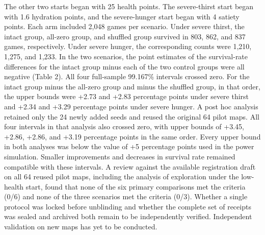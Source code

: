 \documentclass{article}
\begin{document}
The other two starts began with 25 health points. The severe-thirst start began with 1.6 hydration points, and the severe-hunger start began with 4 satiety points. Each arm included 2,048 games per scenario. Under severe thirst, the intact group, all-zero group, and shuffled group survived in 803, 862, and 837 games, respectively. Under severe hunger, the corresponding counts were 1,210, 1,275, and 1,233. In the two scenarios, the point estimates of the survival-rate differences for the intact group minus each of the two control groups were all negative (Table 2). All four full-sample 99.167\% intervals crossed zero. For the intact group minus the all-zero group and minus the shuffled group, in that order, the upper bounds were +2.73 and +2.83 percentage points under severe thirst and +2.34 and +3.29 percentage points under severe hunger. A post hoc analysis retained only the 24 newly added seeds and reused the original 64 pilot maps. All four intervals in that analysis also crossed zero, with upper bounds of +3.45, +2.86, +2.86, and +3.19 percentage points in the same order. Every upper bound in both analyses was below the value of +5 percentage points used in the power simulation. Smaller improvements and decreases in survival rate remained compatible with these intervals. A review against the available registration draft on all 64 reused pilot maps, including the analysis of exploration under the low-health start, found that none of the six primary comparisons met the criteria (0/6) and none of the three scenarios met the criteria (0/3). Whether a single protocol was locked before unblinding and whether the complete set of receipts was sealed and archived both remain to be independently verified. Independent validation on new maps has yet to be conducted.
\end{document}
